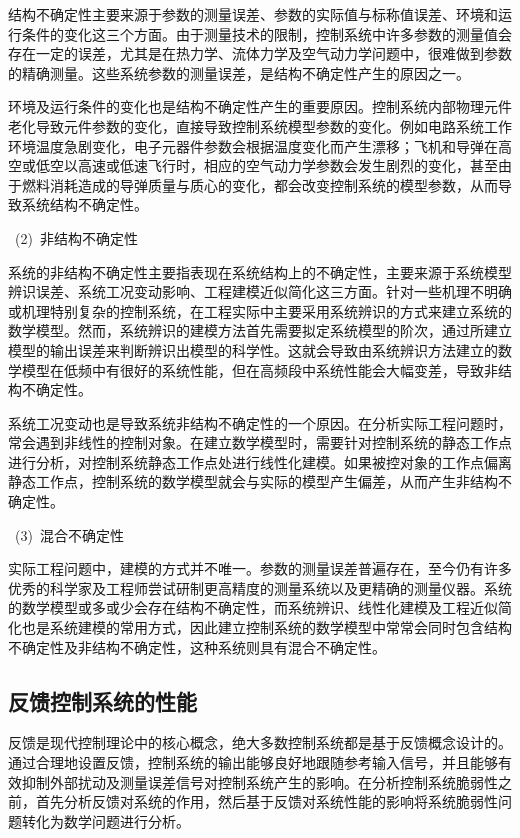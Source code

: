 结构不确定性主要来源于参数的测量误差、参数的实际值与标称值误差、环境和运行条件的变化这三个方面。由于测量技术的限制，控制系统中许多参数的测量值会存在一定的误差，尤其是在热力学、流体力学及空气动力学问题中，很难做到参数的精确测量。这些系统参数的测量误差，是结构不确定性产生的原因之一\cite{Yang2000UncertaintyControl}。

环境及运行条件的变化也是结构不确定性产生的重要原因。控制系统内部物理元件老化导致元件参数的变化，直接导致控制系统模型参数的变化。例如电路系统工作环境温度急剧变化，电子元器件参数会根据温度变化而产生漂移；飞机和导弹在高空或低空以高速或低速飞行时，相应的空气动力学参数会发生剧烈的变化，甚至由于燃料消耗造成的导弹质量与质心的变化，都会改变控制系统的模型参数，从而导致系统结构不确定性\cite{Keel2010Control,Zhao2016FlightControl}。

~(2)~非结构不确定性

系统的非结构不确定性主要指表现在系统结构上的不确定性，主要来源于系统模型辨识误差、系统工况变动影响、工程建模近似简化这三方面。针对一些机理不明确或机理特别复杂的控制系统，在工程实际中主要采用系统辨识的方式来建立系统的数学模型。然而，系统辨识的建模方法首先需要拟定系统模型的阶次，通过所建立模型的输出误差来判断辨识出模型的科学性。这就会导致由系统辨识方法建立的数学模型在低频中有很好的系统性能，但在高频段中系统性能会大幅变差，导致非结构不确定性\cite{Hu2001Uncertainty}。

系统工况变动也是导致系统非结构不确定性的一个原因。在分析实际工程问题时，常会遇到非线性的控制对象。在建立数学模型时，需要针对控制系统的静态工作点进行分析，对控制系统静态工作点处进行线性化建模。如果被控对象的工作点偏离静态工作点，控制系统的数学模型就会与实际的模型产生偏差，从而产生非结构不确定性。

~(3)~混合不确定性

实际工程问题中，建模的方式并不唯一。参数的测量误差普遍存在，至今仍有许多优秀的科学家及工程师尝试研制更高精度的测量系统以及更精确的测量仪器。系统的数学模型或多或少会存在结构不确定性，而系统辨识、线性化建模及工程近似简化也是系统建模的常用方式，因此建立控制系统的数学模型中常常会同时包含结构不确定性及非结构不确定性，这种系统则具有混合不确定性。
\subsection{反馈控制系统的性能}
反馈是现代控制理论中的核心概念，绝大多数控制系统都是基于反馈概念设计的。通过合理地设置反馈，控制系统的输出能够良好地跟随参考输入信号，并且能够有效抑制外部扰动及测量误差信号对控制系统产生的影响。在分析控制系统脆弱性之前，首先分析反馈对系统的作用，然后基于反馈对系统性能的影响将系统脆弱性问题转化为数学问题进行分析。

